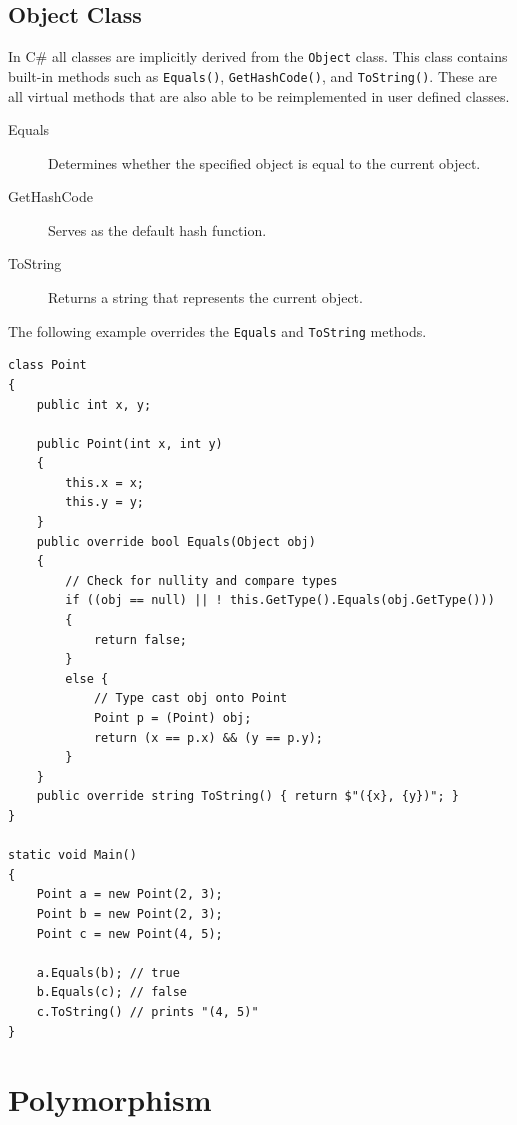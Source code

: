 \documentclass{article}
\begin{document}
\subsection{Object Class}
In C\# all classes are implicitly derived from the \lstinline{Object} class. This class contains built-in methods
such as \lstinline{Equals()}, \lstinline{GetHashCode()}, and \lstinline{ToString()}. These are all virtual methods that
are also able to be reimplemented in user defined classes. 
\begin{description}
    \item[Equals] Determines whether the specified object is equal to the current object.
    \item[GetHashCode] Serves as the default hash function.
    \item[ToString] Returns a string that represents the current object.  
\end{description}
The following example overrides the \lstinline{Equals} and \lstinline{ToString} methods.
\begin{lstlisting}
class Point
{
    public int x, y;

    public Point(int x, int y) 
    {
        this.x = x;
        this.y = y;
    }
    public override bool Equals(Object obj) 
    {
        // Check for nullity and compare types
        if ((obj == null) || ! this.GetType().Equals(obj.GetType()))
        {
            return false;
        }
        else {
            // Type cast obj onto Point 
            Point p = (Point) obj;
            return (x == p.x) && (y == p.y);
        }
    }
    public override string ToString() { return $"({x}, {y})"; }
}

static void Main()
{
    Point a = new Point(2, 3);
    Point b = new Point(2, 3);
    Point c = new Point(4, 5);

    a.Equals(b); // true
    b.Equals(c); // false
    c.ToString() // prints "(4, 5)"
}
\end{lstlisting}
\section{Polymorphism}
\end{document}
